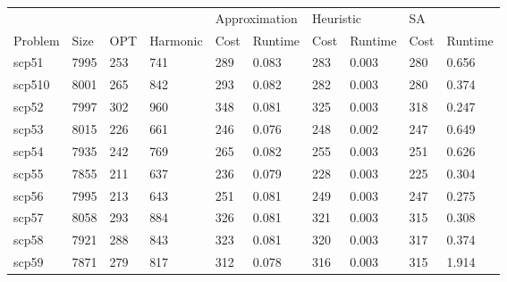 \documentclass{report}
\begin{document}
\begin{table}[]
\centering
\begin{tabular}{@{}llllllllll@{}}
\toprule
        &      &     &          & \multicolumn{2}{l}{Approximation} & \multicolumn{2}{l}{Heuristic} & \multicolumn{2}{l}{SA} \\
Problem & Size & OPT & Harmonic & Cost           & Runtime          & Cost         & Runtime        & Cost     & Runtime     \\ \midrule
scp51   & 7995 & 253 & 741      & 289            & 0.083            & 283          & 0.003          & 280      & 0.656       \\
scp510  & 8001 & 265 & 842      & 293            & 0.082            & 282          & 0.003          & 280      & 0.374       \\
scp52   & 7997 & 302 & 960      & 348            & 0.081            & 325          & 0.003          & 318      & 0.247       \\
scp53   & 8015 & 226 & 661      & 246            & 0.076            & 248          & 0.002          & 247      & 0.649       \\
scp54   & 7935 & 242 & 769      & 265            & 0.082            & 255          & 0.003          & 251      & 0.626       \\
scp55   & 7855 & 211 & 637      & 236            & 0.079            & 228          & 0.003          & 225      & 0.304       \\
scp56   & 7995 & 213 & 643      & 251            & 0.081            & 249          & 0.003          & 247      & 0.275       \\
scp57   & 8058 & 293 & 884      & 326            & 0.081            & 321          & 0.003          & 315      & 0.308       \\
scp58   & 7921 & 288 & 843      & 323            & 0.081            & 320          & 0.003          & 317      & 0.374       \\
scp59   & 7871 & 279 & 817      & 312            & 0.078            & 316          & 0.003          & 315      & 1.914       \\ \bottomrule
\end{tabular}
\end{table}
\end{document}

